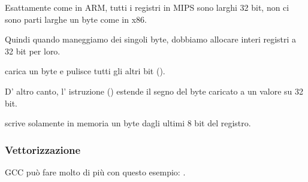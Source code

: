 Esattamente come in ARM, tutti i registri in MIPS sono larghi 32 bit, non ci sono parti larghe un byte come in x86.

Quindi quando maneggiamo dei singoli byte, dobbiamo allocare interi registri a 32 bit per loro.

 carica un byte e pulisce tutti gli altri bit ().

D' altro canto, l' istruzione  ()  estende il segno del byte caricato a un valore su 32 bit.

 scrive solamente in memoria un byte dagli ultimi 8 bit del registro.

\subsubsection{Vettorizzazione}

\Optimizing GCC può fare molto di più con questo esempio: .
